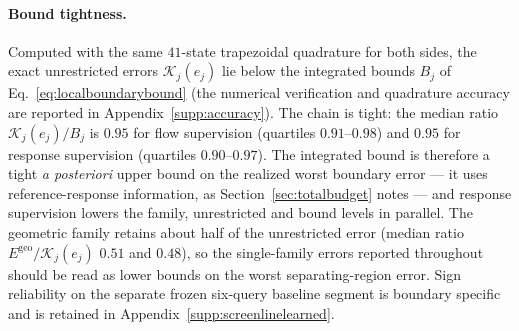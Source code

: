 \paragraph{Bound tightness.}
Computed with the same $41$-state trapezoidal quadrature for both
sides, the exact unrestricted errors $\mathcal K_j(e_j)$ lie below the
integrated bounds $B_j$ of Eq.~\eqref{eq:localboundarybound} (the
numerical verification and quadrature accuracy are reported in
Appendix~\ref{supp:accuracy}). The chain is tight: the median ratio
$\mathcal K_j(e_j)/B_j$ is $0.95$ for flow supervision (quartiles
$0.91$--$0.98$) and $0.95$ for response supervision (quartiles
$0.90$--$0.97$). The integrated bound is therefore a tight
\emph{a posteriori} upper bound on the realized worst boundary error
--- it uses reference-response information, as
Section~\ref{sec:totalbudget} notes --- and response supervision lowers
the family, unrestricted and bound levels in parallel. The geometric
family retains about half of the unrestricted error (median
ratio $E^{\mathrm{geo}}/\mathcal K_j(e_j)$ $0.51$ and $0.48$), so the
single-family errors reported throughout should be read as lower
bounds on the worst separating-region error. Sign reliability on the
separate frozen six-query baseline segment is boundary specific and is
retained in Appendix~\ref{supp:screenlinelearned}.
